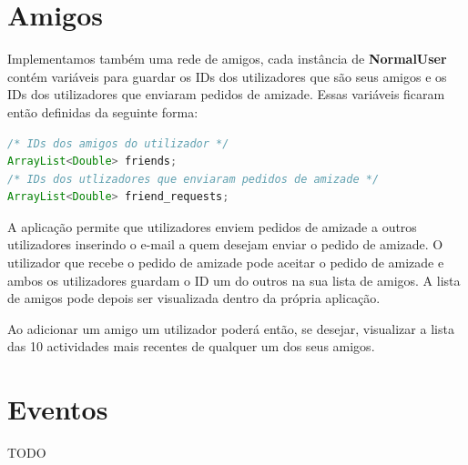 \documentclass{article}
\begin{document}
\section{Amigos}
\par Implementamos também uma rede de amigos, cada instância de \textbf{NormalUser} contém variáveis para guardar
os IDs dos utilizadores que são seus amigos e os IDs dos utilizadores que enviaram pedidos de amizade.
Essas variáveis ficaram então definidas da seguinte forma:
\begin{lstlisting}[language=Java]
/* IDs dos amigos do utilizador */
ArrayList<Double> friends;
/* IDs dos utlizadores que enviaram pedidos de amizade */
ArrayList<Double> friend_requests;
\end{lstlisting}
\par A aplicação permite que utilizadores enviem pedidos de amizade a outros utilizadores inserindo o e-mail a quem desejam
enviar o pedido de amizade. O utilizador que recebe o pedido de amizade pode aceitar o pedido de amizade e ambos os
utilizadores guardam o ID um do outros na sua lista de amigos. A lista de amigos pode depois ser visualizada dentro da
própria aplicação.
\par Ao adicionar um amigo um utilizador poderá então, se desejar, visualizar a lista das 10 actividades mais recentes de qualquer um dos seus amigos.

\pagebreak
\section{Eventos}
TODO










\pagebreak
\end{document}
